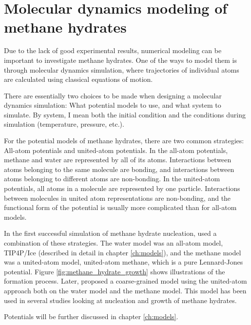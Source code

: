 \section{Molecular dynamics modeling of methane hydrates}
Due to the lack of good experimental results, numerical modeling can be important to investigate methane hydrates. One of the ways to model them is through molecular dynamics simulation, where trajectories of individual atoms are calculated using classical equations of motion. 

There are essentially two choices to be made when designing a molecular dynamics simulation: What potential models to use, and what system to simulate. By system, I mean both the initial condition and the conditions during simulation (temperature, pressure, etc.).

For the potential models of methane hydrates, there are two common strategies: All-atom potentials and united-atom potentials. In the all-atom potentials, methane and water are represented by all of its atoms. Interactions between atoms belonging to the same molecule are bonding, and interactions between atoms belonging to different atoms are non-bonding. In the united-atom potentials, all atoms in a molecule are represented by one particle. Interactions between molecules in united atom representations are non-bonding, and the functional form of the potential is usually more complicated than for all-atom models. 

In the first successful simulation of methane hydrate nucleation, \citet{Walsh2009} used a combination of these strategies. The water model was an all-atom model, TIP4P/Ice (described in detail in chapter \ref{ch:models}), and the methane model was a united-atom model, united-atom methane, which is a pure Lennard-Jones potential. Figure \ref{fig:methane_hydrate_growth} shows illustrations of the formation process.  Later, \citet{Jacobson2010b} proposed a coarse-grained model using the united-atom approach both on the water model and the methane model. This model has been used in several studies looking at nucleation and growth of methane hydrates. 

Potentials will be further discussed in chapter \ref{ch:models}.


